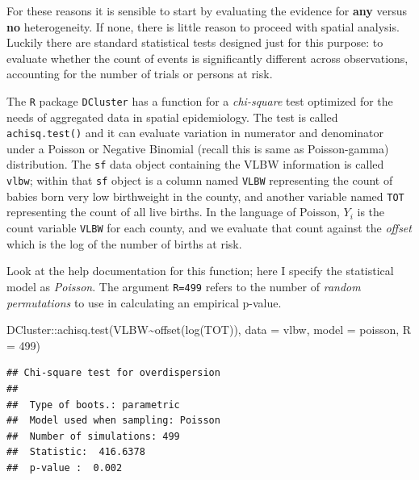 \documentclass[
]{book}
\newenvironment{Shaded}{\begin{snugshade}}{\end{snugshade}}
\newcommand{\AttributeTok}[1]{\textcolor[rgb]{0.77,0.63,0.00}{#1}}
\newcommand{\DecValTok}[1]{\textcolor[rgb]{0.00,0.00,0.81}{#1}}
\newcommand{\FunctionTok}[1]{\textcolor[rgb]{0.00,0.00,0.00}{#1}}
\newcommand{\NormalTok}[1]{#1}
\newcommand{\SpecialCharTok}[1]{\textcolor[rgb]{0.00,0.00,0.00}{#1}}
\newcommand{\StringTok}[1]{\textcolor[rgb]{0.31,0.60,0.02}{#1}}
\begin{document}
For these reasons it is sensible to start by evaluating the evidence for \textbf{any} versus \textbf{no} heterogeneity. If none, there is little reason to proceed with spatial analysis. Luckily there are standard statistical tests designed just for this purpose: to evaluate whether the count of events is significantly different across observations, accounting for the number of trials or persons at risk.

The \texttt{R} package \texttt{DCluster} has a function for a \emph{chi-square} test optimized for the needs of aggregated data in spatial epidemiology. The test is called \texttt{achisq.test()} and it can evaluate variation in numerator and denominator under a Poisson or Negative Binomial (recall this is same as Poisson-gamma) distribution. The \texttt{sf} data object containing the VLBW information is called \texttt{vlbw}; within that \texttt{sf} object is a column named \texttt{VLBW} representing the count of babies born very low birthweight in the county, and another variable named \texttt{TOT} representing the count of all live births. In the language of Poisson, \(Y_i\) is the count variable \texttt{VLBW} for each county, and we evaluate that count against the \emph{offset} which is the log of the number of births at risk.

Look at the help documentation for this function; here I specify the statistical model as \emph{Poisson}. The argument \texttt{R=499} refers to the number of \emph{random permutations} to use in calculating an empirical p-value.

\begin{Shaded}
\begin{Highlighting}[]
\NormalTok{DCluster}\SpecialCharTok{::}\FunctionTok{achisq.test}\NormalTok{(VLBW}\SpecialCharTok{\textasciitilde{}}\FunctionTok{offset}\NormalTok{(}\FunctionTok{log}\NormalTok{(TOT)), }
                      \AttributeTok{data =}\NormalTok{ vlbw, }
                      \AttributeTok{model =} \StringTok{\textquotesingle{}poisson\textquotesingle{}}\NormalTok{,}
                      \AttributeTok{R =} \DecValTok{499}\NormalTok{)}
\end{Highlighting}
\end{Shaded}

\begin{verbatim}
## Chi-square test for overdispersion 
## 
##  Type of boots.: parametric 
##  Model used when sampling: Poisson 
##  Number of simulations: 499 
##  Statistic:  416.6378 
##  p-value :  0.002
\end{verbatim}
\end{document}
